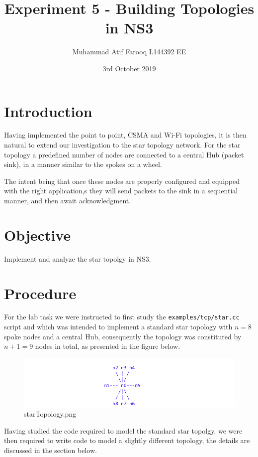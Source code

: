 \documentclass[fullpage]{article}
\begin{document}
   \title{Experiment 5 - Building Topologies in NS3}

   \author{Muhammad Atif Farooq L144392 EE}

   \date{3rd October 2019}

   \maketitle

\section{Introduction}
Having implemented the point to point, CSMA and Wi-Fi topologies, it is then natural
to extend our investigation to the  star topology network. For the star topology a predefined
number of nodes are connected to a central Hub (packet sink), in a manner
similar to the spokes on a wheel.

The intent being that once these nodes are properly configured and equipped
with the right application,s they will send packets to the sink in a sequential manner,
and then await acknowledgment.

\section{Objective}
Implement and analyze the star topolgy in NS3.

\section{Procedure}
For the lab task we were instructed to first study the \verb|examples/tcp/star.cc| script
and which was intended to implement a standard star topology with $n=8$ spoke nodes
and a central Hub, consequently the topology was constituted by $n+1 = 9$ nodes
in total, as presented in the figure below.

\begin{figure}[H]
  \includegraphics[width=\linewidth]{starTopology.png}
  \caption{starTopology.png}
  \label{fig:output0}
\end{figure}

Having studied the code required to model the standard star topolgy, we were then
required to write code to model a slightly different topology, the details are discussed in
the section below.
\end{document}
